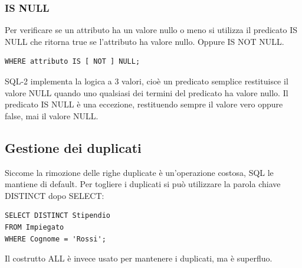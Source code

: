 \documentclass[a4paper,twoside]{article}
\begin{document}
\subsubsection{IS NULL}
Per verificare se un attributo ha un valore nullo o meno si utilizza il predicato
IS NULL che ritorna true se l'attributo ha valore nullo. Oppure IS NOT NULL.

\begin{lstlisting}
WHERE attributo IS [ NOT ] NULL;
\end{lstlisting}

SQL-2 implementa la logica a 3 valori, cioè un predicato semplice restituisce il valore
NULL quando uno qualsiasi dei termini del predicato ha valore nullo. Il predicato IS NULL
è una eccezione, restituendo sempre il valore vero oppure false, mai il valore NULL.

\subsection{Gestione dei duplicati}
Siccome la rimozione delle righe duplicate è un'operazione costosa, SQL le mantiene
di default. Per togliere i duplicati si può utilizzare la parola chiave DISTINCT dopo SELECT:
\begin{lstlisting}
SELECT DISTINCT Stipendio
FROM Impiegato
WHERE Cognome = 'Rossi';
\end{lstlisting}

Il costrutto ALL è invece usato per mantenere i duplicati, ma è superfluo.
\end{document}
